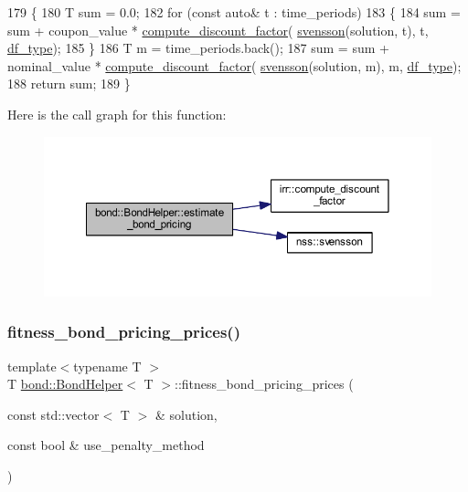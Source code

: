 \begin{DoxyCode}
179     \{
180         T sum = 0.0;
182         \textcolor{keywordflow}{for} (\textcolor{keyword}{const} \textcolor{keyword}{auto}& t : time\_periods)
183         \{
184             sum = sum + coupon\_value * \hyperlink{namespaceirr_ae00c3409ca39fa2dc47ce61da4169a66}{compute\_discount\_factor}(
      \hyperlink{namespacenss_a71aad246261afa16f8bb1a4057570d4b}{svensson}(solution, t), t, \hyperlink{classbond_1_1_bond_helper_a843e3c12a561aaac047ba70310375a2f}{df\_type});
185         \}       
186         T m = time\_periods.back();
187         sum = sum + nominal\_value * \hyperlink{namespaceirr_ae00c3409ca39fa2dc47ce61da4169a66}{compute\_discount\_factor}(
      \hyperlink{namespacenss_a71aad246261afa16f8bb1a4057570d4b}{svensson}(solution, m), m, \hyperlink{classbond_1_1_bond_helper_a843e3c12a561aaac047ba70310375a2f}{df\_type});
188         \textcolor{keywordflow}{return} sum;
189     \}
\end{DoxyCode}
Here is the call graph for this function\+:
\nopagebreak
\begin{figure}[H]
\begin{center}
\leavevmode
\includegraphics[width=350pt]{classbond_1_1_bond_helper_a1288528021e7c60e3a1435d39ad8611d_cgraph}
\end{center}
\end{figure}
\mbox{\label{classbond_1_1_bond_helper_a507eddab3d55ad3e640dfa930dcf43d0}} 
\subsubsection{\texorpdfstring{fitness\+\_\+bond\+\_\+pricing\+\_\+prices()}{fitness\_bond\_pricing\_prices()}}
{\footnotesize\ttfamily template$<$typename T $>$ \\
T \hyperlink{classbond_1_1_bond_helper}{bond\+::\+Bond\+Helper}$<$ T $>$\+::fitness\+\_\+bond\+\_\+pricing\+\_\+prices (\begin{DoxyParamCaption}\item[{const std\+::vector$<$ T $>$ \&}]{solution,  }\item[{const bool \&}]{use\+\_\+penalty\+\_\+method }\end{DoxyParamCaption})\hspace{0.3cm}{\ttfamily [private]}}




